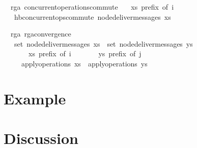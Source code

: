 \documentclass[acmlarge,review,anonymous]{acmart}\settopmatter{printfolios=true}
\begin{document}
\begin{isabellebody}
\isanewline
{}\isamarkupfalse%
\ {\isacharparenleft}\ rga{\isacharparenright}\ concurrent{\isacharunderscore}operations{\isacharunderscore}commute{\isacharcolon}\isanewline
\ \ \ {\isachardoublequoteopen}xs\ prefix\ of\ i{\isachardoublequoteclose}\isanewline
\ \ \ {\isachardoublequoteopen}hb{\isachardot}concurrent{\isacharunderscore}ops{\isacharunderscore}commute\ {\isacharparenleft}node{\isacharunderscore}deliver{\isacharunderscore}messages\ xs{\isacharparenright}{\isachardoublequoteclose}\isanewline
\end{isabellebody}

\begin{isabellebody}
\isanewline
{}\isamarkupfalse%
\ {\isacharparenleft}\ rga{\isacharparenright}\ rga{\isacharunderscore}convergence{\isacharcolon}\isanewline
\ \ \ {\isachardoublequoteopen}set\ {\isacharparenleft}node{\isacharunderscore}deliver{\isacharunderscore}messages\ xs{\isacharparenright}\ {\isacharequal}\ set\ {\isacharparenleft}node{\isacharunderscore}deliver{\isacharunderscore}messages\ ys{\isacharparenright}{\isachardoublequoteclose}\isanewline
\ \ \ \ \ \ \ {\isachardoublequoteopen}xs\ prefix\ of\ i{\isachardoublequoteclose}\isanewline
\ \ \ \ \ \ \ {\isachardoublequoteopen}ys\ prefix\ of\ j{\isachardoublequoteclose}\isanewline
\ \ \ \ \ {\isachardoublequoteopen}apply{\isacharunderscore}operations\ xs\ {\isacharequal}\ apply{\isacharunderscore}operations\ ys{\isachardoublequoteclose}\isanewline
\end{isabellebody}


\section{Example}
\label{sect.example}


\section{Discussion}
\label{sect.discussion}
\end{document}
